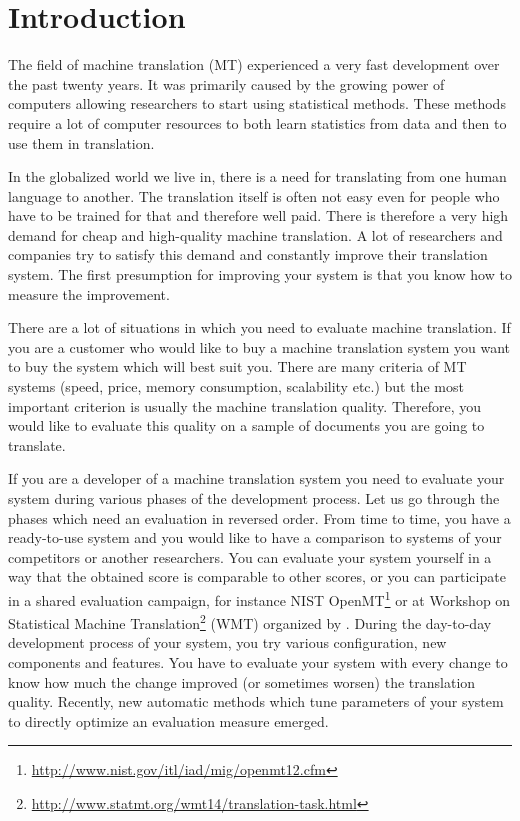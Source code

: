 \chapter{Introduction}

The field of machine translation (MT) experienced a very fast development over
the past twenty years. It was primarily caused by the growing power of
computers allowing researchers to start using statistical methods. These methods
require a lot of computer resources to both learn statistics from data and then
to use them in translation.

In the globalized world we live in, there is a need for translating from one
human language to another. The translation itself is often not easy even for
people who have to be trained for that and therefore well paid. There is
therefore a very high demand for cheap and high-quality machine translation. A
lot of researchers and companies try to satisfy this demand and constantly
improve their translation system. The first presumption for improving your
system is that you know how to measure the improvement.

There are a lot of situations in which you need to evaluate machine
translation. If you are a customer who would like to buy a machine translation
system you want to buy the system which will best suit you. There are many
criteria of MT systems (speed, price, memory consumption, scalability etc.) but
the most important criterion is usually the machine translation quality.
Therefore, you would like to evaluate this quality on a sample of documents you
are going to translate.

If you are a developer of a machine translation system you need to evaluate
your system during various phases of the development process. Let us go through
the phases which need an evaluation in reversed order. From time to time, you
have a ready-to-use system and you would like to have a comparison to systems
of your competitors or another researchers. You can evaluate your system
yourself in a way that the obtained score is comparable to other scores, or you
can participate in a shared evaluation campaign, for instance NIST
OpenMT\footnote{\url{http://www.nist.gov/itl/iad/mig/openmt12.cfm}} or at
Workshop on Statistical Machine
Translation\footnote{\url{http://www.statmt.org/wmt14/translation-task.html}}
(WMT) organized by .  During the day-to-day
development process of your system, you try various configuration, new
components and features. You have to evaluate your system with every change to
know how much the change improved (or sometimes worsen) the translation
quality. Recently, new automatic methods which tune parameters of your system
to directly optimize an evaluation measure emerged.

